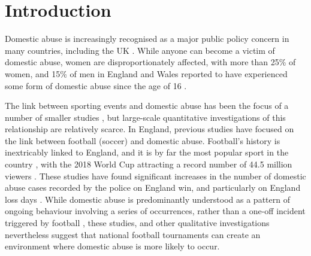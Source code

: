 \documentclass[12pt, a4paper]{article}
\begin{document}
\newpage
\RaggedRight
\section{Introduction}


Domestic abuse is increasingly recognised as a major public policy concern in many countries, including the UK \cite{ep}. While anyone can become a victim of domestic abuse, women are disproportionately affected, with more than 25\% of women, and 15\% of men in England and Wales reported to have experienced some form of domestic abuse since the age of 16 \cite{ONS}.

The link between sporting events and domestic abuse has been the focus of a number of smaller studies \cite{Williams2014}, but large-scale quantitative investigations of this relationship are relatively scarce. In England, previous studies have focused on the link between football (soccer) and domestic abuse. Football's history is inextricably linked to England, and it is by far the most popular sport in the country \cite{Parry2014}, with the 2018 World Cup attracting a record number of 44.5 million viewers \cite{BBC}. These studies have found significant increases in the number of domestic abuse cases recorded by the police on England win, and particularly on England loss days \cite{Brimicombe2012, Kirby2014}. While domestic abuse is predominantly understood as a pattern of ongoing behaviour involving a series of occurrences, rather than a one-off incident triggered by football \cite{Brooks-Hay2018}, these studies, and other qualitative investigations \cite{Swallow} nevertheless suggest that national football tournaments can create an environment where domestic abuse is more likely to occur.


\end{document}
